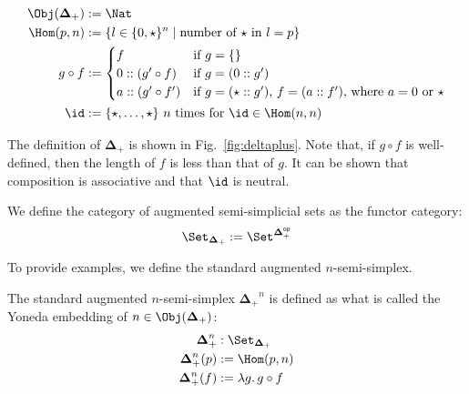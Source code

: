 \documentclass[10pt]{art.cls/art}
\newcommand{\DeltaPlus}{\ensuremath{\boldsymbol{\Delta}_+}}
\newcommand{\kstar}{{\star}}
\begin{document}
\begin{definition}[$\DeltaPlus$]
  \begin{figure*}[!t]
    \begin{align*}
      \Obj(\DeltaPlus) & := \Nat                                                                     \\
      \Hom(p, n)       & := \{l \in \{0, \kstar\}^n \mid \text{number of $\kstar$ in $l = p$}\}      \\
      g \circ f        & :=
      \begin{cases}
        f                  & \text{if $g = \{\}$}                                                      \\
        0 :: (g' \circ f)  & \text{if $g = (0 :: g')$}                                                 \\
        a :: (g' \circ f') & \text{if $g = (\star :: g')$, $f = (a :: f')$, where $a = 0$ or $\kstar$} \\
      \end{cases} \\
      \id              & := \{\kstar, \ldots, \kstar\} \text{ $n$ times for $\id \in \Hom(n, n)$}
    \end{align*}
    \caption{Definition of \DeltaPlus}\label{fig:deltaplus}
  \end{figure*}

  The definition of $\DeltaPlus$ is shown in Fig.~\ref{fig:deltaplus}. Note that, if $g \circ f$ is well-defined, then the length of $f$ is less than that of $g$. It can be shown that composition is associative and that $\id$ is neutral.
\end{definition}

\begin{definition}[$\Set_{\DeltaPlus}$]
  We define the category of augmented semi-simplicial sets as the functor category:
  \begin{equation*}
    \Set_{\DeltaPlus} := \Set^{\DeltaPlus^{\mathsf{op}}}
  \end{equation*}
\end{definition}

To provide examples, we define the standard augmented $n$-semi-simplex.

\begin{definition}[$\DeltaPlus^n$]
  The standard augmented $n$-semi-simplex $\DeltaPlus^n$ is defined as what is called the Yoneda embedding of $n \in \Obj(\DeltaPlus)$:
  \begin{align*}
    \DeltaPlus^n    & : \Set_{\DeltaPlus}        \\
    \DeltaPlus^n(p) & := \Hom(p, n)              \\
    \DeltaPlus^n(f) & := \lambda g .\, g \circ f
  \end{align*}
\end{definition}
\end{document}
